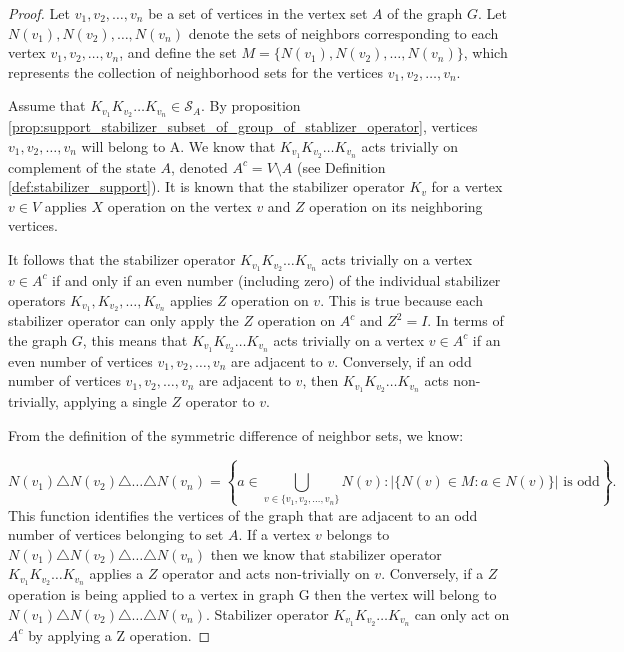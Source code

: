 \documentclass{article}
\begin{document}
\begin{proof}
    Let $ v_1, v_2, \dots, v_n $ be a set of vertices in the vertex set $ A $ of the graph $ G $. Let $ N(v_1), N(v_2), \dots, N(v_n) $ denote the sets of neighbors corresponding to each vertex $ v_1, v_2, \dots, v_n $, and define the set $ M = \{ N(v_1), N(v_2), \dots, N(v_n) \} $, which represents the collection of neighborhood sets for the vertices $ v_1, v_2, \dots, v_n $. 

Assume that $K_{v_1}K_{v_2} \dots K_{v_n} \in \mathcal{S}_A$. By proposition \ref{prop:support_stabilizer_subset_of_group_of_stablizer_operator}, vertices $ v_1, v_2, \dots, v_n $ will belong to A. We know that $K_{v_1}K_{v_2} \dots K_{v_n}$ acts trivially on complement of the state $ A $, denoted $ A^c = V \setminus A $ (see Definition \ref{def:stabilizer_support}). It is known that the stabilizer operator $ K_v $ for a vertex $ v \in V $ applies $ X $ operation on the vertex $ v $ and $ Z $ operation on its neighboring vertices. 


It follows that the stabilizer operator $ K_{v_1} K_{v_2} \dots K_{v_n} $ acts trivially on a vertex $ v \in A^c $ if and only if an even number (including zero) of the individual stabilizer operators $ K_{v_1}, K_{v_2}, \dots, K_{v_n} $ applies $Z$ operation on $ v $. This is true because each stabilizer operator can only apply the $Z$ operation on $A^c$ and $ Z^2 = I $.
In terms of the graph $ G $, this means that $ K_{v_1} K_{v_2} \dots K_{v_n} $ acts trivially on a vertex $ v \in A^c $ if an even number of vertices $ v_1, v_2, \dots, v_n $ are adjacent to $ v $. Conversely, if an odd number of vertices $ v_1, v_2, \dots, v_n $ are adjacent to $ v $, then $ K_{v_1} K_{v_2} \dots K_{v_n} $ acts non-trivially, applying a single $ Z $ operator to $ v $.

From the definition of the symmetric difference of neighbor sets, we know:

\begin{equation} 
N(v_1) \triangle N(v_2) \triangle \dots \triangle N(v_n) = \left\{ a \in \bigcup_{v \in \{v_1, v_2, \dots, v_n\}} N(v) : \left| \{ N(v) \in M : a \in N(v) \} \right| \text{ is odd} \right\}.
\end{equation}
This function identifies the vertices of the graph that are adjacent to an odd number of vertices belonging to set \( A \). If a vertex $v$ belongs to $ N(v_1) \triangle N(v_2) \triangle \dots \triangle N(v_n) $ then we know that stabilizer operator $ K_{v_1} K_{v_2} \dots K_{v_n} $ applies a $Z$ operator and acts non-trivially on $v$. Conversely, if a $Z$ operation is being applied to a vertex in graph G then the vertex will belong to $N(v_1) \triangle N(v_2) \triangle \dots \triangle N(v_n)$. Stabilizer operator $ K_{v_1} K_{v_2} \dots K_{v_n} $ can only act on $A^c$ by applying a Z operation. 


\end{proof}
\end{document}

